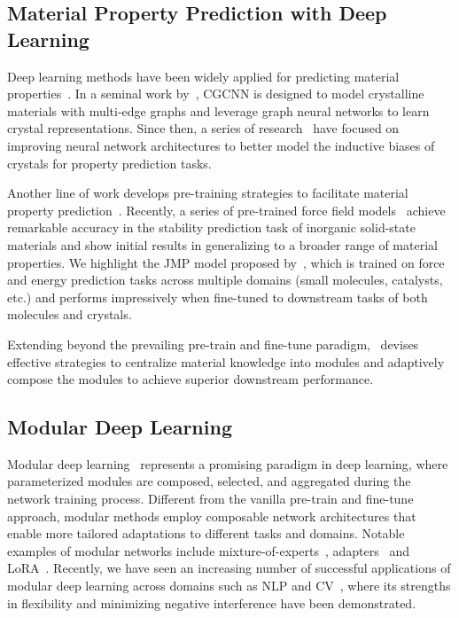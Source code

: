 \subsection{Material Property Prediction with Deep Learning}
Deep learning methods have been widely applied for predicting material properties~\citep{de2021materials}.
In a seminal work by~\citet{xie2018crystal}, CGCNN is designed to model crystalline materials with multi-edge graphs and leverage graph neural networks to learn crystal representations.
Since then, a series of research~\cite{choudhary2021atomistic,yan2022periodic,das2023crysmmnet, lin2023efficient,yan2024complete,taniai2024crystalformer} have focused on improving neural network architectures to better model the inductive biases of crystals for property prediction tasks. 

Another line of work develops pre-training strategies to facilitate material property prediction~\cite{jha2019enhancing, magar2022crystal, zhang2023dpa, wang2024comprehensive,song2024diffusion}.
Recently, a series of pre-trained force field models~\cite{merchant2023scaling, batatia2023foundation, yang2024mattersim, neumann2024orb, barroso2024open} achieve remarkable accuracy in the stability prediction task of inorganic solid-state materials and show initial results in generalizing to a broader range of material properties.
We highlight the JMP model proposed by~\citet{shoghi2023molecules}, which is trained on force and energy prediction tasks across multiple domains (small molecules, catalysts, etc.) and performs impressively when fine-tuned to downstream tasks of both molecules and crystals.

Extending beyond the prevailing pre-train and fine-tune paradigm, \name \ devises effective strategies to centralize material knowledge into modules and adaptively compose the modules to achieve superior downstream performance.


\subsection{Modular Deep Learning}
Modular deep learning~\citep{pfeiffer2023modular} represents a promising paradigm in deep learning, where parameterized modules are composed, selected, and aggregated during the network training process.
Different from the vanilla pre-train and fine-tune approach, modular methods employ composable network architectures that enable more tailored adaptations to different tasks and domains. Notable examples of modular networks include mixture-of-experts~\citep{jacobs1991adaptive, shazeer2016outrageously}, adapters~\citep{houlsby2019parameter} and LoRA~\citep{hu2021lora}.
Recently, we have seen an increasing number of successful applications of modular deep learning across domains such as NLP and CV~\citep{puigcerver2020scalable, pfeiffer2020adapterhub, huang2023lorahub, zhang2023composing,tan2024neuron,pham2024mixturegrowth}, where its strengths in flexibility and minimizing negative interference have been demonstrated.


